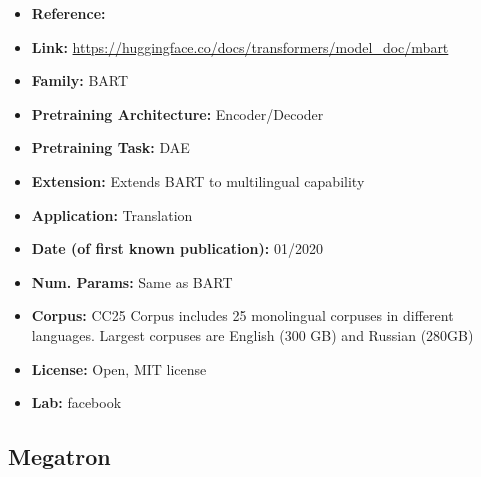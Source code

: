 \documentclass{article}
\begin{document}
            \begin{itemize}
                \item \textbf{Reference:} 
                \item \textbf{Link:} \url{https://huggingface.co/docs/transformers/model_doc/mbart}
                \item \textbf{Family:} BART 
                \item \textbf{Pretraining Architecture:} Encoder/Decoder
                \item \textbf{Pretraining Task:} DAE
                \item \textbf{Extension:} Extends BART to multilingual capability
                \item \textbf{Application:} Translation
                \item \textbf{Date (of first known publication):} 01/2020
                \item \textbf{Num. Params:} Same as BART
                \item \textbf{Corpus:} CC25 Corpus includes 25 monolingual corpuses in different languages. Largest corpuses are English (300 GB) and Russian (280GB)
                \item \textbf{License:} Open, MIT license
                \item \textbf{Lab:} facebook
            \end{itemize}

\subsection{Megatron}
\end{document}
